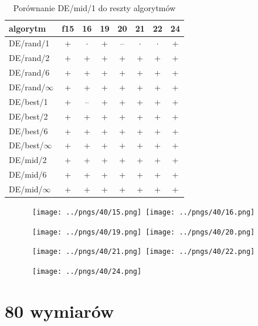 \documentclass[a4paper,onecolumn,oneside,11pt,wide,floatssmall]{mwrep}
\theoremstyle{definition}
\theoremstyle{plain}%
\theoremstyle{remark}
\begin{document}
\begin{table}[H]
\centering
\begin{tabular}{ l | c | c | c | c | c | c | c }
algorytm         &f15& 16& 19& 20& 21& 22& 24 \\ \hline
DE/rand/1	 & + & $\cdot$ & + & -- & $\cdot$ & $\cdot$ & + \\
DE/rand/2	 & + & + & + & + & + & + & + \\
DE/rand/6	 & + & + & + & + & + & + & + \\
DE/rand/$\infty$	 & + & + & + & + & + & + & + \\
DE/best/1	 & + & -- & + & + & + & + & + \\
DE/best/2	 & + & + & + & + & + & + & + \\
DE/best/6	 & + & + & + & + & + & + & + \\
DE/best/$\infty$	 & + & + & + & + & + & + & + \\
DE/mid/2	 & + & + & + & + & + & + & + \\
DE/mid/6	 & + & + & + & + & + & + & + \\
DE/mid/$\infty$	 & + & + & + & + & + & + & + \\
\end{tabular}
\caption{Porównanie DE/mid/1 do reszty algorytmów}
\end{table}

\begin{figure}[H]
\centering
\mbox{
\texttt{[image: ../pngs/40/15.png]} \quad
\texttt{[image: ../pngs/40/16.png]} 
}
\end{figure}

\begin{figure}[H]
\centering
\mbox{
\texttt{[image: ../pngs/40/19.png]} \quad
\texttt{[image: ../pngs/40/20.png]} 
}
\end{figure}

\begin{figure}[H]
\centering
\mbox{
\texttt{[image: ../pngs/40/21.png]} \quad
\texttt{[image: ../pngs/40/22.png]} 
}
\end{figure}

\begin{figure}[H]
\centering
\mbox{
\texttt{[image: ../pngs/40/24.png]} \quad
}
\end{figure}

\section{80 wymiarów}
\end{document}
